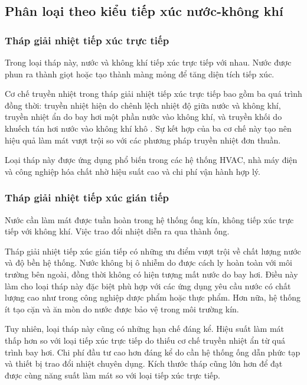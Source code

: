 \documentclass[../main.tex]{subfiles}
\begin{document}
\subsection{Phân loại theo kiểu tiếp xúc nước-không khí}
\label{sec:classification_by_contact_type}

\subsubsection{Tháp giải nhiệt tiếp xúc trực tiếp}
Trong loại tháp này, nước và không khí tiếp xúc trực tiếp với nhau. Nước được phun ra thành giọt hoặc tạo thành màng mỏng để tăng diện tích tiếp xúc.

Cơ chế truyền nhiệt trong tháp giải nhiệt tiếp xúc trực tiếp bao gồm ba quá trình đồng thời: truyền nhiệt hiện do chênh lệch nhiệt độ giữa nước và không khí, truyền nhiệt ẩn do bay hơi một phần nước vào không khí, và truyền khối do khuếch tán hơi nước vào không khí khô \cite{ashrae2020cooling}. Sự kết hợp của ba cơ chế này tạo nên hiệu quả làm mát vượt trội so với các phương pháp truyền nhiệt đơn thuần.

Loại tháp này được ứng dụng phổ biến trong các hệ thống HVAC, nhà máy điện và công nghiệp hóa chất nhờ hiệu suất cao và chi phí vận hành hợp lý.

\subsubsection{Tháp giải nhiệt tiếp xúc gián tiếp}
Nước cần làm mát được tuần hoàn trong hệ thống ống kín, không tiếp xúc trực tiếp với không khí. Việc trao đổi nhiệt diễn ra qua thành ống.

Tháp giải nhiệt tiếp xúc gián tiếp có những ưu điểm vượt trội về chất lượng nước và độ bền hệ thống. Nước không bị ô nhiễm do được cách ly hoàn toàn với môi trường bên ngoài, đồng thời không có hiện tượng mất nước do bay hơi. Điều này làm cho loại tháp này đặc biệt phù hợp với các ứng dụng yêu cầu nước có chất lượng cao như trong công nghiệp dược phẩm hoặc thực phẩm. Hơn nữa, hệ thống ít tạo cặn và ăn mòn do nước được bảo vệ trong môi trường kín.

Tuy nhiên, loại tháp này cũng có những hạn chế đáng kể. Hiệu suất làm mát thấp hơn so với loại tiếp xúc trực tiếp do thiếu cơ chế truyền nhiệt ẩn từ quá trình bay hơi. Chi phí đầu tư cao hơn đáng kể do cần hệ thống ống dẫn phức tạp và thiết bị trao đổi nhiệt chuyên dụng. Kích thước tháp cũng lớn hơn để đạt được cùng năng suất làm mát so với loại tiếp xúc trực tiếp.
\end{document}
